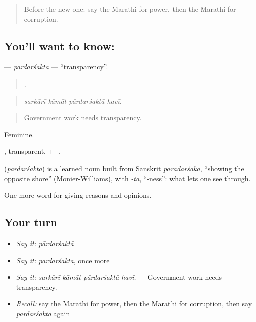 \label{lesson:MR-C363-pardarsakta}



\begin{quote}
Before the new one: say the Marathi for power, then the Marathi for corruption.
\end{quote}

\subsection*{You'll want to know: }
\textbf{} — \emph{pārdarśaktā} — \textquotedblleft{}transparency\textquotedblright{}.

\begin{quote}
   .
\end{quote}

\begin{quote}
\emph{sarkārī kāmāt pārdarśaktā havī.}
\end{quote}

\begin{quote}
Government work needs transparency.
\end{quote}

Feminine.

, transparent, + -.

\begin{cousinweb}
\textbf{} (\emph{pārdarśaktā}) is a learned noun built from Sanskrit \emph{pāradarśaka}, \textquotedblleft{}showing the opposite shore\textquotedblright{} (Monier-Williams), with \emph{-tā}, \textquotedblleft{}-ness\textquotedblright{}: what lets one see through.
\end{cousinweb}

\begin{grammarlens}[title={What you've built}]
One more word for giving reasons and opinions.
\end{grammarlens}

\subsection*{Your turn}
\begin{itemize}
\raggedright
  \item \emph{Say it:} \emph{pārdarśaktā}
  \item \emph{Say it:} \emph{pārdarśaktā}, once more
  \item \emph{Say it:} \emph{sarkārī kāmāt pārdarśaktā havī.} — Government work needs transparency.
  \item \emph{Recall:} say the Marathi for power, then the Marathi for corruption, then say \emph{pārdarśaktā} again
\end{itemize}

